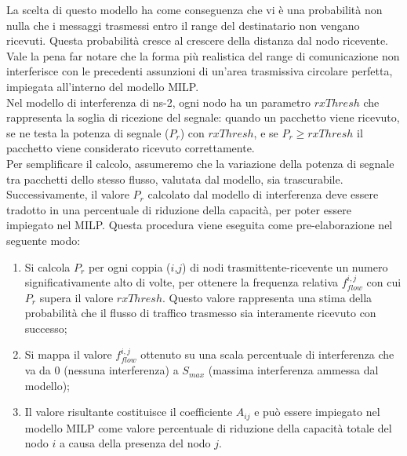 La scelta di questo modello ha come conseguenza che vi è una probabilità non nulla che i messaggi trasmessi entro il range del destinatario non vengano ricevuti. Questa probabilità cresce al crescere della distanza dal nodo ricevente. \\
Vale la pena far notare che la forma più realistica del range di comunicazione non interferisce con le precedenti assunzioni di un'area trasmissiva circolare perfetta, impiegata all'interno del modello MILP.\\
Nel modello di interferenza di ns-2, ogni nodo ha un parametro $rxThresh$ che rappresenta la soglia di ricezione del segnale: quando un pacchetto viene ricevuto, se ne testa la potenza di segnale ($P_r$) con $rxThresh$, e se $ P_r \geq rxThresh$ il pacchetto viene considerato ricevuto correttamente. \\
Per semplificare il calcolo, assumeremo che la variazione della potenza di segnale tra pacchetti dello stesso flusso, valutata dal modello, sia trascurabile. \\
Successivamente, il valore $P_r$ calcolato dal modello di interferenza deve essere tradotto in una percentuale di riduzione della capacità, per poter essere impiegato nel MILP. Questa procedura viene eseguita come pre-elaborazione nel seguente modo:
\begin{enumerate}  
	\item Si calcola $P_r$ per ogni coppia ($i$,$j$) di nodi trasmittente-ricevente un numero significativamente alto di volte, per ottenere la frequenza relativa $f_{flow}^{i,j}$ con cui $P_r$ supera il valore $rxThresh$. Questo valore rappresenta una stima della probabilità che il flusso di traffico trasmesso sia interamente ricevuto con successo;
	\item Si mappa il valore $f_{flow}^{i,j}$ ottenuto su una scala percentuale di interferenza che va da $0$ (nessuna interferenza) a $S_{max}$ (massima interferenza ammessa dal modello);
	\item Il valore risultante costituisce il coefficiente $A_{ij}$ e può essere impiegato nel modello MILP come valore percentuale di riduzione della capacità totale del nodo $i$ a causa della presenza del nodo $j$.
\end{enumerate}







